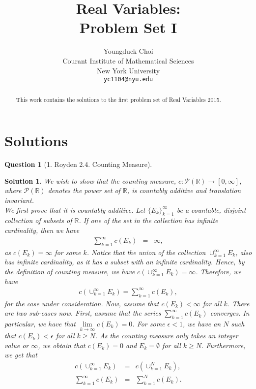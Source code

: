 \documentclass{article} %
\title{Real Variables: \\
Problem Set I}
\author{
Youngduck Choi \\
Courant Institute of Mathematical Sciences \\
New York University \\
\texttt{yc1104@nyu.edu} \\
}
\theoremstyle{quest}
\newtheorem*{question}{Question}
\newtheorem*{solution}{Solution}
\begin{document}
\maketitle

\begin{abstract}
This work contains the solutions to the first problem set of Real Variables 2015.
\end{abstract}

\section{Solutions}
\begin{question}[1. Royden 2.4. Counting Measure]
\end{question}
\begin{solution}
We wish to show that the counting measure, $c: \mathcal{P}(\mathbb{R}) 
\to [0,\infty]$, where $\mathcal{P}(\mathbb{R})$ denotes the power set of $\mathbb{R}$, is
countably additive and translation invariant. \\ 

We first prove that it is countably additive. Let $\{ E_k \}_{k=1}^{\infty}$ be a countable,
disjoint collection of subsets of $\mathbb{R}$. 
If one of the set in the collection has infinite cardinality, then 
we have  
\begin{eqnarray*}
\sum_{k=1}^{\infty} c(E_k) &=& \infty,
\end{eqnarray*}
as $c(E_k) = \infty$ for some $k$. Notice that the union of the collection $\cup_{k=1}^{\infty} E_k$,
also has infinite cardinality, as it has a subset with an infinite cardinality. Hence, by the definition
of counting measure, we have
$c(\cup_{k=1}^{\infty}E_k) = \infty$. Therefore, we have
\begin{eqnarray*}
c(\cup_{k=1}^{\infty}E_k) = \sum_{k=1}^{\infty} c(E_k),
\end{eqnarray*}
for the case under consideration. Now, assume that $c(E_k) < \infty$ for all $k$. There are
two sub-cases now. First, assume that the series $\sum_{k=1}^{\infty} c(E_k )$ converges. 
In particular, we have that $\underset{k \to \infty}{\lim} c(E_k ) = 0$. For some 
$\epsilon < 1$,
we have an $N$ such that $c(E_k ) < \epsilon$ for all $k \geq N$. As the counting measure only
takes an integer value or $\infty$, we obtain that $c(E_k) = 0$ and $E_k = \emptyset$
for all $k \geq N$. Furthermore, we get that  
\begin{eqnarray*}
c(\cup_{k=1}^{\infty} E_k) &=& c(\cup_{k=1}^{N}E_k), \\ 
\sum_{k=1}^{\infty} c(E_k) &=& \sum_{k=1}^{N} c(E_k).
\end{eqnarray*}


\end{solution}
\end{document}

